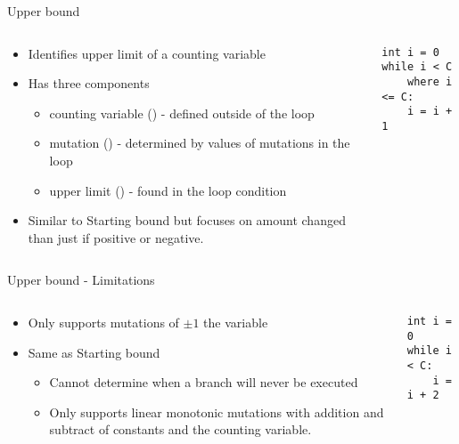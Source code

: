 \begin{frame}[fragile]{Upper bound}

\begin{columns}

\begin{column}{0.5\textwidth}
\begin{itemize}
\item Identifies upper limit of a counting variable
\item Has three components
\begin{itemize}
    \item counting variable () - defined outside of the loop 
    \item mutation (\code{<=}) - determined by values of mutations in the loop
    \item upper limit () - found in the loop condition
\end{itemize}
\item Similar to Starting bound but focuses on amount changed than just
    if positive or negative.
\end{itemize}
\end{column}

\begin{column}{0.5\textwidth}
\begin{verbatim}
int i = 0
while i < C
    where i <= C:
    i = i + 1
\end{verbatim}
\end{column}

\end{columns}

\end{frame}



\begin{frame}[fragile]{Upper bound - Limitations}

\begin{columns}

\begin{column}{0.5\textwidth}
\begin{itemize}
\item Only supports mutations of $\pm 1$ the variable
\item Same as Starting bound
\begin{itemize}
    \item Cannot determine when a branch will never be executed
    \item Only supports linear monotonic mutations with addition and subtract
        of constants and the counting variable.
\end{itemize}
\end{itemize}
\end{column}

\begin{column}{0.5\textwidth}
\begin{verbatim}
int i = 0
while i < C:
    i = i + 2
\end{verbatim}
\end{column}

\end{columns}
\end{frame}



